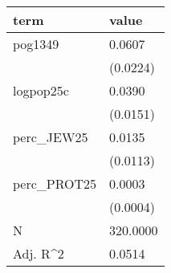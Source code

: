 
\begin{tabular}{ll}
\toprule
term & value\\
\midrule
pog1349 & 0.0607\\
 & (0.0224)\\
logpop25c & 0.0390\\
 & (0.0151)\\
perc\_JEW25 & 0.0135\\
\addlinespace
 & (0.0113)\\
perc\_PROT25 & 0.0003\\
 & (0.0004)\\
N & 320.0000\\
Adj. R\textasciicircum{}2 & 0.0514\\
\bottomrule
\end{tabular}
